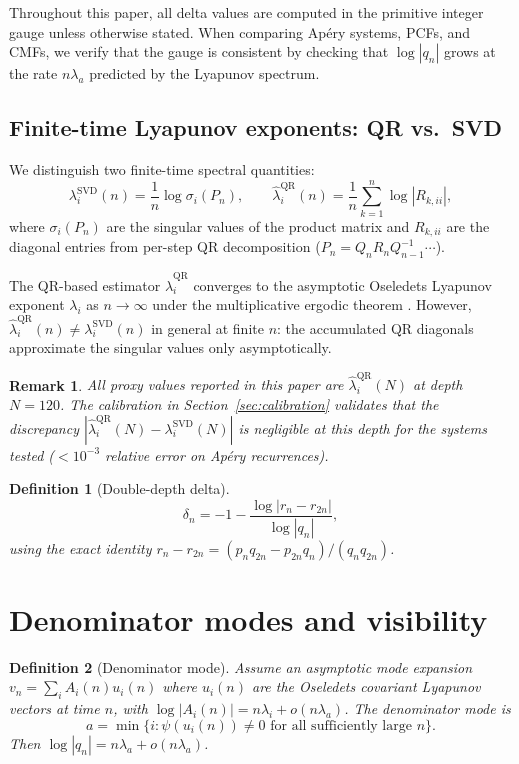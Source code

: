 \documentclass[11pt]{article}
\newtheorem{definition}{Definition}
\newtheorem{remark}{Remark}
\begin{document}
Throughout this paper, all delta values are computed in the primitive integer gauge unless otherwise stated. When comparing Ap\'ery systems, PCFs, and CMFs, we verify that the gauge is consistent by checking that $\log|q_n|$ grows at the rate $n\lambda_a$ predicted by the Lyapunov spectrum.

\subsection{Finite-time Lyapunov exponents: QR vs.\ SVD}
\label{sec:qr_svd}

We distinguish two finite-time spectral quantities:
\[
\lambda_i^{\mathrm{SVD}}(n) = \frac{1}{n}\log\sigma_i(P_n), \qquad
\widehat\lambda_i^{\mathrm{QR}}(n) = \frac{1}{n}\sum_{k=1}^n \log|R_{k,ii}|,
\]
where $\sigma_i(P_n)$ are the singular values of the product matrix and $R_{k,ii}$ are the diagonal entries from per-step QR decomposition ($P_n = Q_n R_n Q_{n-1}^{-1} \cdots$).

The QR-based estimator $\widehat\lambda_i^{\mathrm{QR}}$ converges to the asymptotic Oseledets Lyapunov exponent $\lambda_i$ as $n \to \infty$ under the multiplicative ergodic theorem \cite{oseledets1968}. However, $\widehat\lambda_i^{\mathrm{QR}}(n) \neq \lambda_i^{\mathrm{SVD}}(n)$ in general at finite $n$: the accumulated QR diagonals approximate the singular values only asymptotically.

\begin{remark}
All proxy values reported in this paper are $\widehat\lambda_i^{\mathrm{QR}}(N)$ at depth $N=120$. The calibration in Section~\ref{sec:calibration} validates that the discrepancy $|\widehat\lambda_i^{\mathrm{QR}}(N) - \lambda_i^{\mathrm{SVD}}(N)|$ is negligible at this depth for the systems tested ($< 10^{-3}$ relative error on Ap\'ery recurrences).
\end{remark}

\begin{definition}[Double-depth delta]
\[
\delta_n = -1 - \frac{\log|r_n - r_{2n}|}{\log|q_n|},
\]
using the exact identity $r_n - r_{2n} = (p_n q_{2n} - p_{2n} q_n)/(q_n q_{2n})$.
\end{definition}

\section{Denominator modes and visibility}

\begin{definition}[Denominator mode]
Assume an asymptotic mode expansion $v_n = \sum_i A_i(n) u_i(n)$ where $u_i(n)$ are the Oseledets covariant Lyapunov vectors at time $n$, with $\log|A_i(n)| = n\lambda_i + o(n\lambda_a)$. The denominator mode is
\[
a = \min\{i : \psi(u_i(n)) \neq 0 \text{ for all sufficiently large } n\}.
\]
Then $\log|q_n| = n\lambda_a + o(n\lambda_a)$.
\end{definition}
\end{document}
